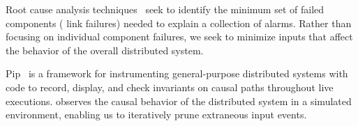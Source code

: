 
Root cause analysis techniques~\cite{577079} seek to identify the minimum set of failed
components (\eg{} link failures) needed to explain a collection of alarms. Rather than
focusing on individual component failures, we seek to minimize inputs that affect the behavior
of the overall distributed system.


Pip~\cite{pip} is a framework for instrumenting general-purpose distributed systems
with code to record, display, and check invariants on causal paths throughout
live executions. \Simulator{} observes the causal behavior of the
distributed system in a simulated environment, enabling us to iteratively prune extraneous input events.


